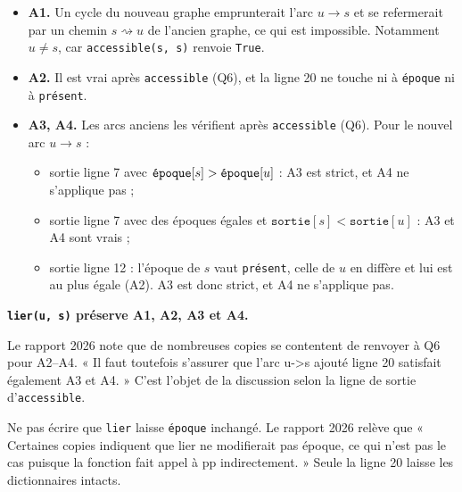 \documentclass[11pt,a4paper]{article}
\providecommand{\tightlist}{\setlength{\itemsep}{0pt}\setlength{\parskip}{0pt}}
\begin{document}
\begin{itemize}
\tightlist
\item
  \textbf{A1.} Un cycle du nouveau graphe emprunterait l'arc \(u\to s\) et se refermerait par un chemin \(s\rightsquigarrow u\) de l'ancien graphe, ce qui est impossible. Notamment \(u\neq s\), car \texttt{accessible(s,\ s)} renvoie \texttt{True}.
\item
  \textbf{A2.} Il est vrai après \texttt{accessible} (Q6), et la ligne 20 ne touche ni à \texttt{époque} ni à \texttt{présent}.
\item
  \textbf{A3, A4.} Les arcs anciens les vérifient après \texttt{accessible} (Q6). Pour le nouvel arc \(u\to s\) :

  \begin{itemize}
  \tightlist
  \item
    sortie ligne 7 avec \(\texttt{\text{époque}}[s]>\texttt{\text{époque}}[u]\) : A3 est strict, et A4 ne s'applique pas ;
  \item
    sortie ligne 7 avec des époques égales et \(\texttt{sortie}[s]<\texttt{sortie}[u]\) : A3 et A4 sont vrais ;
  \item
    sortie ligne 12 : l'époque de \(s\) vaut \texttt{présent}, celle de \(u\) en diffère et lui est au plus égale (A2). A3 est donc strict, et A4 ne s'applique pas.
  \end{itemize}
\end{itemize}

\textbf{\texttt{lier(u,\ s)} préserve A1, A2, A3 et A4.}

\begin{jury}

Le rapport 2026 note que de nombreuses copies se contentent de renvoyer à Q6 pour A2--A4. « Il faut toutefois s'assurer que l'arc u-\textgreater s ajouté ligne 20 satisfait également A3 et A4. » C'est l'objet de la discussion selon la ligne de sortie d'\texttt{accessible}.

\end{jury}

\begin{piege}

Ne pas écrire que \texttt{lier} laisse \texttt{époque} inchangé. Le rapport 2026 relève que « Certaines copies indiquent que lier ne modifierait pas époque, ce qui n'est pas le cas puisque la fonction fait appel à pp indirectement. » Seule la ligne 20 laisse les dictionnaires intacts.

\end{piege}
\end{document}
